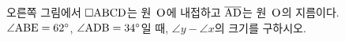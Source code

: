 \noindent\begin{minipage}[t]{0.58\linewidth}\vspace{0pt}\raggedright 오른쪽 그림에서 $\square\mathrm{ABCD}$는 원~$\mathrm{O}$에 내접하고 $\overline{\mathrm{AD}}$는 원~$\mathrm{O}$의 지름이다. $\angle\mathrm{ABE}=62^\circ$, $\angle\mathrm{ADB}=34^\circ$일 때, $\angle y-\angle x$의 크기를 구하시오.\end{minipage}\hfill\begin{minipage}[t]{0.4\linewidth}\vspace{0pt}\centering \resizebox{\ifdim\width>\linewidth\linewidth\else\width\fi}{!}{}\end{minipage}\par

